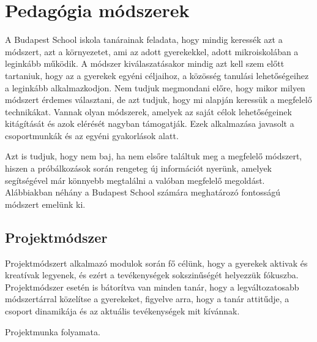 \section{Pedagógia
  módszerek}
A Budapest School iskola tanárainak feladata, hogy mindig keressék azt a
módszert, azt a környezetet, ami az adott gyerekekkel, adott mikroiskolában a
leginkább működik. A módszer kiválaszatásakor mindig azt kell szem előtt
tartaniuk, hogy az a gyerekek egyéni céljaihoz, a közösség tanulási
lehetőségeihez a leginkább alkalmazkodjon. Nem tudjuk megmondani előre, hogy mikor milyen módszert érdemes választani, de
azt tudjuk, hogy mi alapján keressük a megfelelő technikákat. Vannak olyan módszerek, amelyek az
saját célok lehetőségeinek kitágítását és azok elérését nagyban támogatják.
Ezek alkalmazása javasolt a csoportmunkák és az egyéni gyakorlások alatt.

Azt is tudjuk,
hogy nem baj, ha nem elsőre találtuk meg a megfelelő módszert, hiszen a
próbálkozások során rengeteg új információt nyerünk, amelyek segítségével már
könnyebb megtalálni a valóban megfelelő megoldást. Alábbiakban néhány a Budapest School számára meghatározó fontosságú módszert
emelünk ki.

\subsection{Projektmódszer}
Projektmódszert alkalmazó modulok során fő célünk, hogy a gyerekek aktivak és
kreatívak legyenek, és ezért a tevékenységek sokszinűségét helyezzük fókuszba.
Projektmódszer esetén is bátorítva van minden tanár, hogy a legváltozatosabb
módszertárral közelítse a gyerekeket, figyelve arra, hogy a tanár attitűdje, a
csoport dinamikája és az aktuális tevékenységek mit kívánnak.

Projektmunka folyamata.

